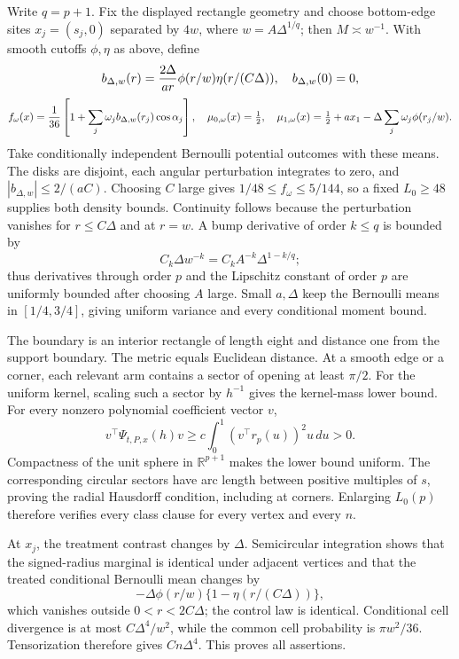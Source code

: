 Write \(q=p+1\).  Fix the displayed rectangle geometry and choose bottom-edge sites \(x_j=(s_j,0)\) separated by \(4w\), where \(w=A\Delta^{1/q}\); then \(M\asymp w^{-1}\).  With smooth cutoffs \(\phi,\eta\) as above, define
\[
 b_{\Delta,w}(r)={2\Delta\over ar}\phi(r/w)\eta(r/(C\Delta)),\quad b_{\Delta,w}(0)=0,
\]
\[
 f_\omega(x)={1\over36}\left[1+\sum_j\omega_jb_{\Delta,w}(r_j)\cos\alpha_j\right],
\quad \mu_{0,\omega}(x)=\tfrac12,
\quad \mu_{1,\omega}(x)=\tfrac12+ax_1-\Delta\sum_j\omega_j\phi(r_j/w).
\]
Take conditionally independent Bernoulli potential outcomes with these means.  The disks are disjoint, each angular perturbation integrates to zero, and \(|b_{\Delta,w}|\leq2/(aC)\).  Choosing \(C\) large gives \(1/48\leq f_\omega\leq5/144\), so a fixed \(L_0\geq48\) supplies both density bounds.  Continuity follows because the perturbation vanishes for \(r\leq C\Delta\) and at \(r=w\).  A bump derivative of order \(k\leq q\) is bounded by
\[
 C_k\Delta w^{-k}=C_kA^{-k}\Delta^{1-k/q};
\]
thus derivatives through order \(p\) and the Lipschitz constant of order \(p\) are uniformly bounded after choosing \(A\) large.  Small \(a,\Delta\) keep the Bernoulli means in \([1/4,3/4]\), giving uniform variance and every conditional moment bound.

The boundary is an interior rectangle of length eight and distance one from the support boundary.  The metric equals Euclidean distance.  At a smooth edge or a corner, each relevant arm contains a sector of opening at least \(\pi/2\).  For the uniform kernel, scaling such a sector by \(h^{-1}\) gives the kernel-mass lower bound.  For every nonzero polynomial coefficient vector \(v\),
\[
 v^\top\Psi_{t,P,x}(h)v\geq c\int_0^1(v^\top r_p(u))^2u\,du>0.
\]
Compactness of the unit sphere in \(\mathbb R^{p+1}\) makes the lower bound uniform.  The corresponding circular sectors have arc length between positive multiples of \(s\), proving the radial Hausdorff condition, including at corners.  Enlarging \(L_0(p)\) therefore verifies every class clause for every vertex and every \(n\).

At \(x_j\), the treatment contrast changes by \(\Delta\).  Semicircular integration shows that the signed-radius marginal is identical under adjacent vertices and that the treated conditional Bernoulli mean changes by
\[
 -\Delta\phi(r/w)\{1-\eta(r/(C\Delta))\},
\]
which vanishes outside \(0<r<2C\Delta\); the control law is identical.  Conditional cell divergence is at most \(C\Delta^4/w^2\), while the common cell probability is \(\pi w^2/36\).  Tensorization therefore gives \(Cn\Delta^4\).  This proves all assertions.